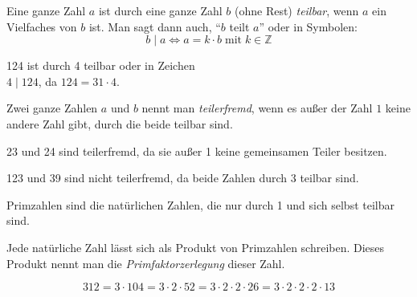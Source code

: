 \begin{defi}[Teilbarkeit]
 Eine ganze Zahl \(a\) ist durch eine ganze Zahl \(b\) (ohne Rest) \emph{teilbar}, wenn \(a\) ein Vielfaches von \(b\) ist. Man sagt dann auch, "`\(b\) teilt \(a\)"' oder in Symbolen:
 \begin{equation*}
  b\mid a \Leftrightarrow a = k\cdot b\;\text{mit}\;k\in\mathbb{Z}
 \end{equation*}
\end{defi}

\begin{bsp}[Teilbarkeit]
 124 ist durch 4 teilbar oder in Zeichen \\\(4 \mid 124\), da \(124 = 31 \cdot 4\).
\end{bsp}


\begin{defi}[teilerfremd]
 Zwei ganze Zahlen \(a\) und \(b\) nennt man \emph{teilerfremd}, wenn es außer der Zahl \(1\) keine andere Zahl gibt, durch die beide teilbar sind.
\end{defi}

\begin{bsp}[teilerfremd]
 23 und 24 sind teilerfremd, da sie außer 1 keine gemeinsamen Teiler besitzen.
 
 123 und 39 sind nicht teilerfremd, da beide Zahlen durch 3 teilbar sind.
\end{bsp}

\begin{defi}[Primzahl]
Primzahlen sind die natürlichen Zahlen, die nur durch 1 und sich selbst teilbar sind.
\end{defi}
\begin{folg}
Jede natürliche Zahl lässt sich als Produkt von Primzahlen schreiben. Dieses Produkt nennt man die \emph{Primfaktorzerlegung} dieser Zahl.
\end{folg}
\begin{bsp}
 \begin{equation*}
  312 = 3\cdot 104 = 3\cdot 2 \cdot 52 = 3\cdot 2 \cdot 2 \cdot 26 = 3\cdot 2\cdot 2 \cdot 2 \cdot 13
 \end{equation*} 
\end{bsp}

